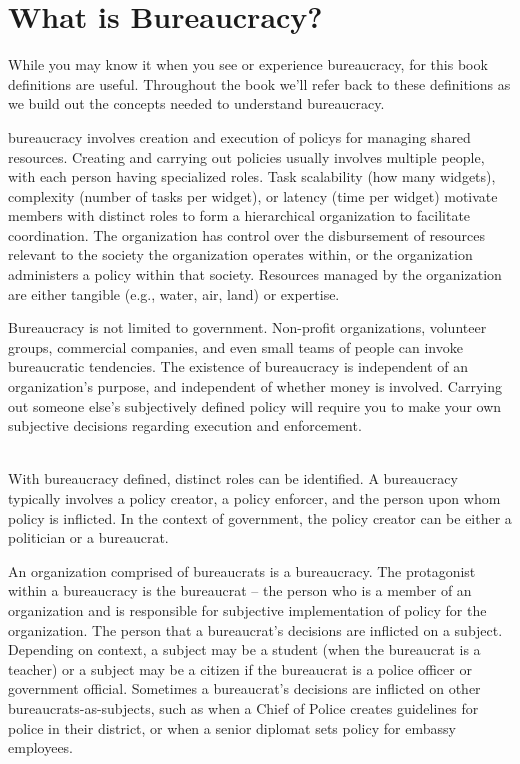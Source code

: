 \section{What is Bureaucracy?\label{sec:define-bureaucracy}}

While you may know it when you see or experience bureaucracy, for this book definitions are useful. Throughout the book we'll refer back to these definitions as we build out the concepts needed to understand bureaucracy.

\Gls{bureaucracy} involves creation and execution of \glspl{policy} for managing shared resources. Creating and carrying out policies usually involves multiple people, with each person having specialized roles. Task scalability (how many widgets), complexity (number of tasks per widget), or latency (time per widget) motivate members with distinct roles to form a hierarchical organization to facilitate coordination. The organization has control over the disbursement of resources relevant to the society the organization operates within, or the organization administers a policy within that society. Resources managed by the organization are either tangible (e.g., water, air, land) or expertise.  

Bureaucracy is not limited to government. Non-profit organizations, volunteer groups, commercial companies, and even small teams of people can invoke bureaucratic tendencies. The existence of bureaucracy is independent of an organization's purpose, and independent of whether money is involved. Carrying out someone else's subjectively defined policy will require you to make your own subjective decisions regarding execution and enforcement. 

\ \\

With bureaucracy defined, distinct roles can be identified.
A bureaucracy typically involves a policy creator, a policy enforcer, and the person upon whom policy is inflicted. In the context of government, the policy creator can be either a politician or a bureaucrat. 

An organization comprised of bureaucrats is a \gls{bureaucracy}. The protagonist within a bureaucracy is the \gls{bureaucrat} -- the person who is a member of an organization and is responsible for subjective implementation of policy for the organization. The person that a bureaucrat's decisions are inflicted on a \gls{subject}.  Depending on context, a subject may be a student (when the bureaucrat is a teacher) or a subject may be a citizen if the bureaucrat is a police officer or government official. Sometimes a bureaucrat's decisions are inflicted on other bureaucrats-as-subjects, such as when a Chief of Police creates guidelines for police in their district, or when a senior diplomat sets policy for embassy employees. 



